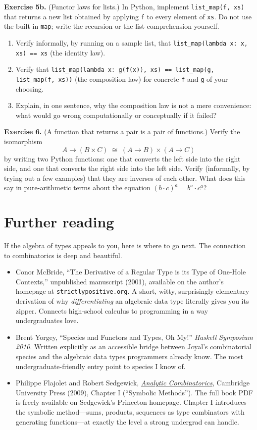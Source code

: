 \documentclass[11pt]{article}
\begin{document}
\bigskip
\textbf{Exercise 5b.}\label{ex:ta:5b} (Functor laws for lists.) In Python, implement \texttt{list\_map(f, xs)} that returns a new list obtained by applying \texttt{f} to every element of \texttt{xs}. Do not use the built-in \texttt{map}; write the recursion or the list comprehension yourself.
\begin{enumerate}[label=(\alph*)]
  \item Verify informally, by running on a sample list, that \texttt{list\_map(lambda x: x, xs) == xs} (the identity law).
  \item Verify that \texttt{list\_map(lambda x: g(f(x)), xs) == list\_map(g, list\_map(f, xs))} (the composition law) for concrete \texttt{f} and \texttt{g} of your choosing.
  \item Explain, in one sentence, why the composition law is not a mere convenience: what would go wrong computationally or conceptually if it failed?
\end{enumerate}

\bigskip
\textbf{Exercise 6.}\label{ex:ta:6} (A function that returns a pair is a pair of functions.) Verify the isomorphism
\[
  A \to (B \times C) \;\cong\; (A \to B) \times (A \to C)
\]
by writing two Python functions: one that converts the left side into the right side, and one that converts the right side into the left side. Verify (informally, by trying out a few examples) that they are inverses of each other. What does this say in pure-arithmetic terms about the equation $(b \cdot c)^a = b^a \cdot c^a$?

\section*{Further reading}

If the algebra of types appeals to you, here is where to go next. The connection to combinatorics is deep and beautiful.

\begin{itemize}
  \item Conor McBride, ``The Derivative of a Regular Type is its Type of One-Hole Contexts,'' unpublished manuscript (2001), available on the author's homepage at \texttt{strictlypositive.org}. A short, witty, surprisingly elementary derivation of why \emph{differentiating} an algebraic data type literally gives you its zipper. Connects high-school calculus to programming in a way undergraduates love.
  \item Brent Yorgey, ``Species and Functors and Types, Oh My!'' \emph{Haskell Symposium 2010}. Written explicitly as an accessible bridge between Joyal's combinatorial species and the algebraic data types programmers already know. The most undergraduate-friendly entry point to species I know of.
  \item Philippe Flajolet and Robert Sedgewick, \emph{\href{https://ac.cs.princeton.edu/home/}{Analytic Combinatorics}}, Cambridge University Press (2009), Chapter I (``Symbolic Methods''). The full book PDF is freely available on Sedgewick's Princeton homepage. Chapter I introduces the symbolic method---sums, products, sequences as type combinators with generating functions---at exactly the level a strong undergrad can handle.
\end{itemize}
\end{document}
